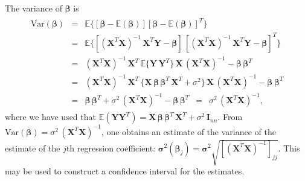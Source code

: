 \documentclass[letterpaper,10pt,english]{sphinxmanual}
\begin{document}
The variance of \(\boldsymbol{\beta}\) is
\begin{equation*}
\begin{split}
\begin{eqnarray*}
\mbox{Var}(\boldsymbol{\beta}) & = & \mathbb{E} \{ [\boldsymbol{\beta} - \mathbb{E}(\boldsymbol{\beta})] [\boldsymbol{\beta} - \mathbb{E}(\boldsymbol{\beta})]^{T} \}
\\
& = & \mathbb{E} \{ [(\mathbf{X}^{T} \mathbf{X})^{-1} \, \mathbf{X}^{T} \mathbf{Y} - \boldsymbol{\beta}] \, [(\mathbf{X}^{T} \mathbf{X})^{-1} \, \mathbf{X}^{T} \mathbf{Y} - \boldsymbol{\beta}]^{T} \}
\\
& = & (\mathbf{X}^{T} \mathbf{X})^{-1} \, \mathbf{X}^{T} \, \mathbb{E} \{ \mathbf{Y} \, \mathbf{Y}^{T} \} \, \mathbf{X} \, (\mathbf{X}^{T} \mathbf{X})^{-1} - \boldsymbol{\beta} \, \boldsymbol{\beta}^{T}
\\
& = & (\mathbf{X}^{T} \mathbf{X})^{-1} \, \mathbf{X}^{T} \, \{ \mathbf{X} \, \boldsymbol{\beta} \, \boldsymbol{\beta}^{T} \,  \mathbf{X}^{T} + \sigma^2 \} \, \mathbf{X} \, (\mathbf{X}^{T} \mathbf{X})^{-1} - \boldsymbol{\beta} \, \boldsymbol{\beta}^{T}
\\
& = & \boldsymbol{\beta} \, \boldsymbol{\beta}^{T}  + \sigma^2 \, (\mathbf{X}^{T} \mathbf{X})^{-1} - \boldsymbol{\beta} \, \boldsymbol{\beta}^{T}
\, \, \, = \, \, \, \sigma^2 \, (\mathbf{X}^{T} \mathbf{X})^{-1},
\end{eqnarray*}
\end{split}
\end{equation*}
where we have used  that \(\mathbb{E} (\mathbf{Y} \mathbf{Y}^{T}) =
\mathbf{X} \, \boldsymbol{\beta} \, \boldsymbol{\beta}^{T} \, \mathbf{X}^{T} +
\sigma^2 \, \mathbf{I}_{nn}\). From \(\mbox{Var}(\boldsymbol{\beta}) = \sigma^2
\, (\mathbf{X}^{T} \mathbf{X})^{-1}\), one obtains an estimate of the
variance of the estimate of the \(j\)\sphinxhyphen{}th regression coefficient:
\(\boldsymbol{\sigma}^2 (\boldsymbol{\beta}_j ) = \boldsymbol{\sigma}^2 \sqrt{
[(\mathbf{X}^{T} \mathbf{X})^{-1}]_{jj} }\). This may be used to
construct a confidence interval for the estimates.
\end{document}
